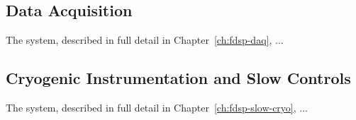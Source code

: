 \subsection{Data Acquisition}
\label{sec:fdsp-ov-daq}

The  system, described in full detail in Chapter~\ref{ch:fdsp-daq}, ...

\subsection{Cryogenic Instrumentation and Slow Controls}
\label{sec:fdsp-ov-instr}

The  system, described in full detail in Chapter~\ref{ch:fdsp-slow-cryo}, ...





